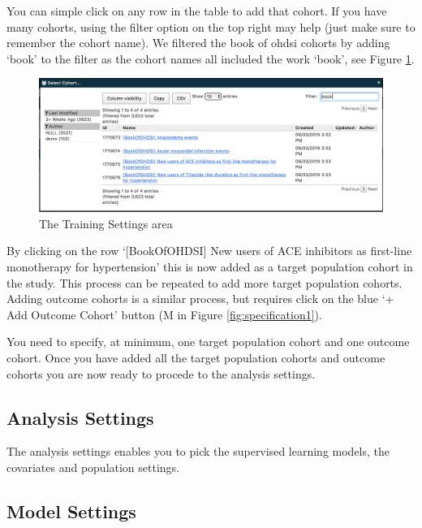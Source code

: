 \documentclass[11pt]{book}
\theoremstyle{definition}
\theoremstyle{definition}
\theoremstyle{definition}
\theoremstyle{remark}
\begin{document}
You can simple click on any row in the table to add that cohort. If you have many cohorts, using the filter option on the top right may help (just make sure to remember the cohort name). We filtered the book of ohdsi cohorts by adding `book' to the filter as the cohort names all included the work `book', see Figure \ref{fig:figure2l}.

\begin{figure}
\includegraphics[width=1\linewidth]{images/PatientLevelPrediction/atlasImplementation/target_pop_cohort_filter} \caption{The Training Settings area}\label{fig:figure2l}
\end{figure}

By clicking on the row `{[}BookOfOHDSI{]} New users of ACE inhibitors as first-line monotherapy for hypertension' this is now added as a target population cohort in the study. This process can be repeated to add more target population cohorts. Adding outcome cohorts is a similar process, but requires click on the blue `+ Add Outcome Cohort' button (M in Figure \ref{fig:specification1}).

You need to specify, at minimum, one target population cohort and one outcome cohort. Once you have added all the target population cohorts and outcome cohorts you are now ready to procede to the analysis settings.

\hypertarget{analysis-settings}{%
\subsection{Analysis Settings}\label{analysis-settings}}

The analysis settings enables you to pick the supervised learning models, the covariates and population settings.

\hypertarget{model-settings}{%
\subsection{Model Settings}\label{model-settings}}
\end{document}
